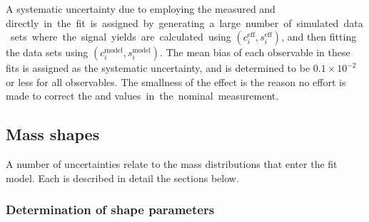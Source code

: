 A systematic uncertainty due to employing the measured \ci and \si directly in the fit is assigned by generating a large number of simulated data sets where the signal yields are calculated using $(c_i^\text{eff}, s_i^\text{eff})$, and then fitting the data sets using $(c_i^\text{model}, s_i^\text{model})$. The mean bias of each observable in these fits is assigned as the systematic uncertainty, and is determined to be $0.1\times 10^{-2}$ or less for all observables. The smallness of the effect is the reason no effort is made to correct the \ci and \si values in the nominal measurement.








\subsection{Mass shapes} %
\label{sub:systematics_from_mass_shapes}


A number of uncertainties relate to the mass distributions that enter the fit model. Each is described in detail the sections below.

\subsubsection{Determination of shape parameters} %
\label{ssub:determination_of_shape_parameters}

